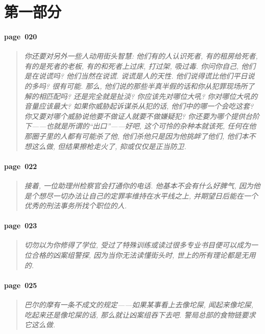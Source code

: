 \section{第一部分}

\paragraph*{page~020}
\begin{quotation}
    \itshape
    你还要对另外一些人动用街头智慧: 他们有的人认识死者, 有的租房给死者, 有的是死者的老板, 有的和死者上过床, 打过架, 吸过毒. 你问你自己, 他们是在说谎吗? 他们当然在说谎. 说谎是人的天性. 他们说得谎比他们平日说的多吗? 很有可能. 那么, 他们说的那些半真半假的话和你从犯罪现场所了解的相匹配吗? 还是完全就是扯淡? 你应该先对哪位大吼? 你对哪位大吼的音量应该最大? 如果你威胁起诉谋杀从犯的话, 他们中的哪一个会吃这套? 你又要对哪个威胁说他要不做证人就要不做嫌疑犯? 你还要为哪个提供台阶下------也就是所谓的``出口''------好吧, 这个可怜的杂种本就该死, 任何在他那圈子里的人都有可能杀了他, 他们杀他只是因为他挑衅了他们, 他们本不想这么做, 但结果擦枪走火了, 抑或仅仅是正当防卫.
\end{quotation}

\paragraph*{page~022}
\begin{quotation}
    \itshape
    接着, 一位助理州检察官会打通你的电话. 他基本不会有什么好脾气, 因为他是个想尽一切办法让自己的定罪率维持在水平线之上, 并期望日后能在一个优秀的刑法事务所找个职位的人.
\end{quotation}

\paragraph*{page~023}
\begin{quotation}
    \itshape
    切勿以为你修得了学位, 受过了特殊训练或读过很多专业书目便可以成为一位合格的凶案组警探, 因为当你无法读懂街头时, 世上的所有理论都是无用的.
\end{quotation}

\paragraph*{page~025}
\begin{quotation}
    \itshape
    巴尔的摩有一条不成文的规定------如果某事看上去像坨屎, 闻起来像坨屎, 吃起来还是像坨屎的话, 那么就让凶案组吞下去吧. 警局总部的食物链要求它这么做. 
\end{quotation}

